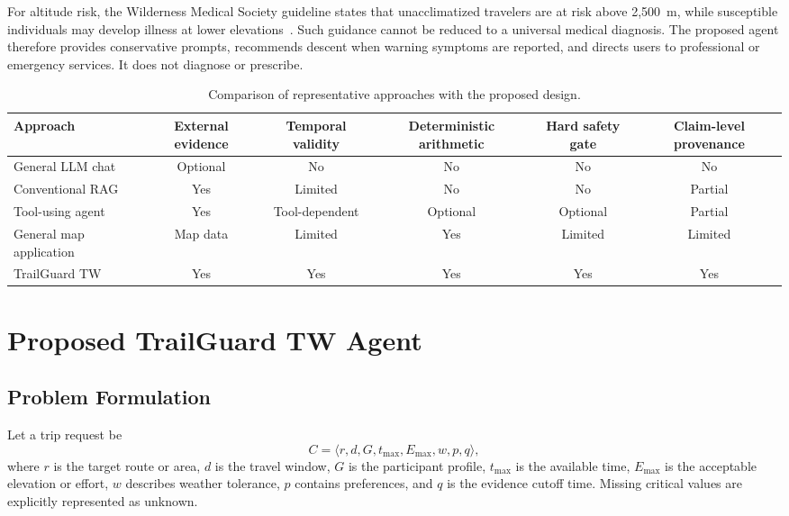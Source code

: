 \documentclass[conference]{IEEEtran}
\begin{document}
For altitude risk, the Wilderness Medical Society guideline states that
unacclimatized travelers are at risk above 2,500~m, while susceptible
individuals may develop illness at lower elevations~\cite{luks2019}. Such
guidance cannot be reduced to a universal medical diagnosis. The proposed
agent therefore provides conservative prompts, recommends descent when
warning symptoms are reported, and directs users to professional or emergency
services. It does not diagnose or prescribe.

\begin{table}[t]
\caption{Comparison of representative approaches with the proposed design.}
\label{tab:related}
\centering
\small
\begin{tabular}{p{2.6cm}ccccc}
\toprule
Approach & External evidence & Temporal validity & Deterministic arithmetic &
Hard safety gate & Claim-level provenance \\
\midrule
General LLM chat & Optional & No & No & No & No \\
Conventional RAG~\cite{lewis2020rag} & Yes & Limited & No & No & Partial \\
Tool-using agent~\cite{yao2023react,schick2023toolformer} & Yes & Tool-dependent &
Optional & Optional & Partial \\
General map application & Map data & Limited & Yes & Limited & Limited \\
TrailGuard TW & Yes & Yes & Yes & Yes & Yes \\
\bottomrule
\end{tabular}
\end{table}

\section{Proposed TrailGuard TW Agent}
\label{sec:architecture}
\subsection{Problem Formulation}
Let a trip request be
\begin{equation}
C=\langle r,d,G,t_{\max},E_{\max},w,p,q\rangle,
\end{equation}
where $r$ is the target route or area, $d$ is the travel window, $G$ is the
participant profile, $t_{\max}$ is the available time, $E_{\max}$ is the
acceptable elevation or effort, $w$ describes weather tolerance, $p$ contains
preferences, and $q$ is the evidence cutoff time. Missing critical values are
explicitly represented as unknown.
\end{document}
